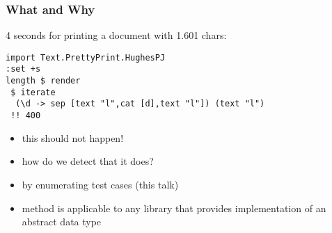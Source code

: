 \begin{frame}[fragile]
\frametitle{What and Why}
4 seconds for printing a document with 1.601 chars:
\begin{small}
\begin{verbatim}
import Text.PrettyPrint.HughesPJ
:set +s
length $ render
 $ iterate 
  (\d -> sep [text "l",cat [d],text "l"]) (text "l") 
 !! 400
\end{verbatim}
\end{small}

  \begin{itemize} %
  \item this should not happen!
  \item how do we detect that it does?
  \item by enumerating test cases (this talk)
  \item method is applicable to any library
    that provides implementation of an abstract data type
  \end{itemize}

\end{frame}

